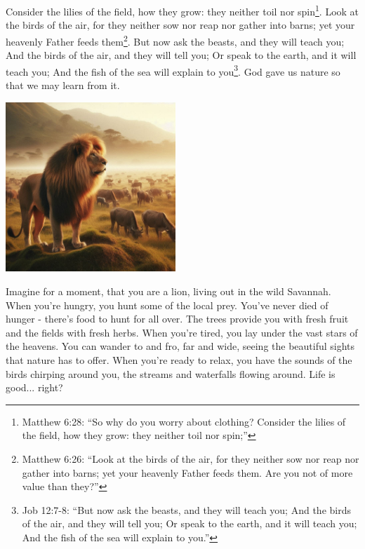 \documentclass[10pt]{article}
\begin{document}
\begin{multicols}{2}


Consider the lilies of the field, how they grow: they neither toil nor spin\footnote{Matthew 6:28: ``So why do you worry about clothing? Consider the lilies of the field, how they grow: they neither toil nor spin;''}. Look at the birds of the air, for they neither sow nor reap nor gather into barns; yet your heavenly Father feeds them\footnote{Matthew 6:26: ``Look at the birds of the air, for they neither sow nor reap nor gather into barns; yet your heavenly Father feeds them. Are you not of more value than they?''}. But now ask the beasts, and they will teach you; And the birds of the air, and they will tell you; Or speak to the earth, and it will teach you; And the fish of the sea will explain to you\footnote{Job 12:7-8: ``But now ask the beasts, and they will teach you; And the birds of the air, and they will tell you; Or speak to the earth, and it will teach you; And the fish of the sea will explain to you.''}. God gave us nature so that we may learn from it.

\begin{center}
	\includegraphics[width=0.48\textwidth]{lion.jpeg}
\end{center}

Imagine for a moment, that you are a lion, living out in the wild Savannah. When you're hungry, you hunt some of the local prey. You've never died of hunger - there's food to hunt for all over. The trees provide you with fresh fruit and the fields with fresh herbs. When you're tired, you lay under the vast stars of the heavens. You can wander to and fro, far and wide, seeing the beautiful sights that nature has to offer. When you're ready to relax, you have the sounds of the birds chirping around you, the streams and waterfalls flowing around. Life is good... right?


\end{multicols}
\end{document}

